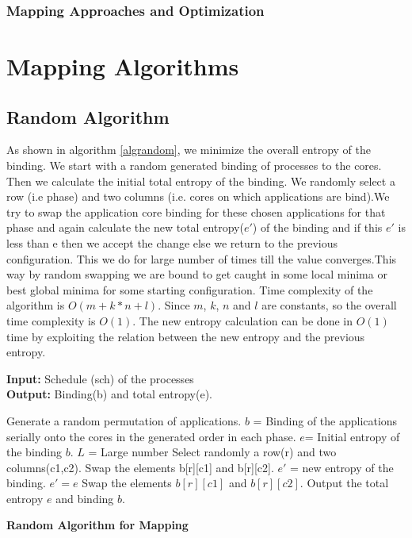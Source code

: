 \documentclass[10pt, conference]{IEEEtran}
\begin{document}
\subsubsection{Mapping Approaches and Optimization}

\section{Mapping Algorithms}

\subsection{Random Algorithm}
As shown in algorithm \ref{algrandom}, we minimize the overall entropy of the binding. We start with a random generated binding of processes to the cores. Then we calculate the initial total entropy of the binding. We randomly select a row (i.e phase) and two columns (i.e. cores on which applications are bind).We try to swap the application core binding for these chosen applications for that phase and again calculate the new total entropy($e'$) of the binding and if this $e'$ is less than e then we accept the change else we return to the previous configuration. This we do for large number of times till the value converges.This way by random swapping we are bound to get caught in some local minima or best global minima for some starting configuration. Time complexity of the algorithm is $O(m + k*n + l)$. Since $m$, $k$, $n$ and $l$ are constants, so the overall time complexity is $O(1)$. The new entropy calculation can be done in $O(1)$ time by exploiting the relation between the new entropy and the previous entropy.

\begin{algorithm}[tb]
\footnotesize
\textbf{Input:} Schedule (sch) of the processes \ \\
\textbf{Output:} Binding(b) and total entropy(e).
\begin{algorithmic}[1]
\STATE  Generate a random permutation of applications.  
\STATE  $b$ = Binding of the applications serially onto the cores in the generated order in each phase.
\STATE  $e$=  Initial entropy of the binding $b$.
\STATE  $L$ = Large number
\STATE Select randomly a row(r) and two columns(c1,c2).
\STATE Swap the elements b[r][c1] and b[r][c2].
\STATE $e'$ = new entropy of the binding.
\STATE $e' = e$
\ELSE
\STATE Swap the elements $b[r][c1]$ and $b[r][c2]$.
\ENDIF
\ENDFOR
\STATE Output the total entropy $e$ and binding $b$.
\end{algorithmic}
\caption{\textbf{Random Algorithm for Mapping}}
\vspace{-0.1cm}
\label{algrandom}
\end{algorithm}
\end{document}
